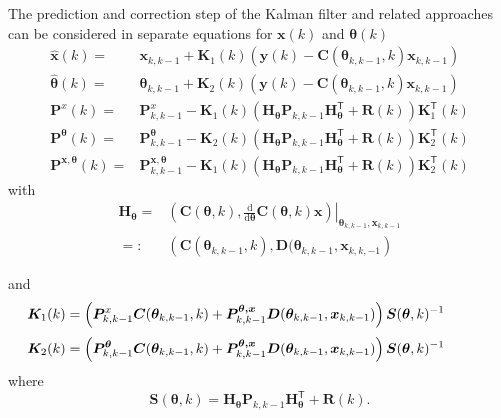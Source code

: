 \documentclass[10pt]{article}
\begin{document}
\begin{spacing}{1}
The prediction and correction step of the Kalman filter and related approaches can be considered in separate equations for $\bm{x}(k)$ and $\bm{\theta}(k)$~\cite{Ljung:1979vz}
\begin{align}
	\hat{\bm{x}}(k) =& \bm{x}_{k,k-1} + \bm{K}_1(k)\left( \bm{y}(k)-\bm{C}(\bm{\theta}_{k,k-1},k)\bm{x}_{k,k-1} \right) \\
	\hat{\bm{\theta}}(k) =& \bm{\theta}_{k,k-1} + \bm{K}_2(k) \left( \bm{y}(k)-\bm{C}(\bm{\theta}_{k,k-1},k)\bm{x}_{k,k-1} \right) \label{eq:update_theta}\\
	\bm{P}^x(k) =& \bm{P}_{k,k-1}^{x} - \bm{K}_1(k)\left( \bm{H}_{\bm{\theta}}\bm{P}_{k,k-1}\bm{H}^{\mathsf{T}}_{\bm{\theta}}+\bm{R}(k) \right)\bm{K}_1^{\mathsf{T}}(k) \\
	\bm{P}^{\bm{\theta}}(k) =& \bm{P}_{k,k-1}^{\bm{\theta}} - \bm{K}_2(k)\left( \bm{H}_{\bm{\theta}}\bm{P}_{k,k-1}\bm{H}^{\mathsf{T}}_{\bm{\theta}}+\bm{R}(k) \right)\bm{K}_2^{\mathsf{T}}(k) \label{eq:update_Ptheta} \\
	\bm{P}^{\bm{x,\theta}}(k) =& \bm{P}_{k,k-1}^{\bm{x,\theta}} - \bm{K}_1(k)\left( \bm{H}_{\bm{\theta}}\bm{P}_{k,k-1}\bm{H}^{\mathsf{T}}_{\bm{\theta}}+\bm{R}(k) \right)\bm{K}_2^{\mathsf{T}}(k)
\end{align} 
with
\begin{align*} 
\bm{H}_{\bm{\theta}} =& \left.\left( \bm{C}(\bm{\theta},k),\frac{\mathrm{d}}{\mathrm{d}\bm{\theta}} \bm{C}(\bm{\theta},k)\bm{x} \right)\right|_{\bm{\theta}_{k,k-1},\bm{x}_{k,k-1}} \\
					=:& \left( \bm{C}(\bm{\theta}_{k,k-1},k), \bm{D}(\bm{\theta}_{k,k-1},\bm{x}_{k,k,-1} \right)
\end{align*}

and
\[
\hspace{-8ex}
	\bm{K}_1(k) = \left( \bm{P}_{k,k-1}^{x}\bm{C}(\bm{\theta}_{k,k-1},k) + \bm{P}_{k,k-1}^{\bm{\theta,x}}\bm{D}(\bm{\theta}_{k,k-1},\bm{x}_{k,k-1}) \right)\bm{S}(\bm{\theta},k)^{-1}
\]
\[
\hspace{-8ex}
	\bm{K}_2(k) = \left( \bm{P}_{k,k-1}^{\bm{\theta}}\bm{C}(\bm{\theta}_{k,k-1},k) + \bm{P}_{k,k-1}^{\bm{\theta,x}}\bm{D}(\bm{\theta}_{k,k-1},\bm{x}_{k,k-1}) \right)\bm{S}(\bm{\theta},k)^{-1}
\]
where 
\[ \bm{S}(\bm{\theta},k) =  \bm{H}_{\bm{\theta}}\bm{P}_{k,k-1}\bm{H}^{\mathsf{T}}_{\bm{\theta}}+\bm{R}(k) .\]


\end{spacing}
\end{document}
